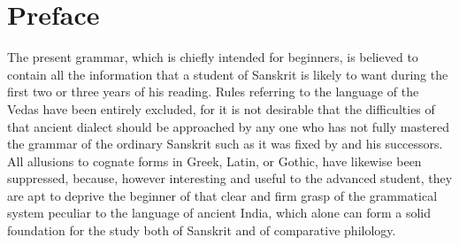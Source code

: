 \def\DevnagVersion{2.17}%
\chapter{Preface}

The present grammar, which is chiefly intended for beginners, is
believed to contain all the information that a student of Sanskrit is
likely to want during the first two or three years of his reading. Rules
referring to the language of the Vedas have been entirely excluded, for
it is not desirable that the difficulties of that ancient dialect should
be approached by any one who has not fully mastered the grammar of the
ordinary Sanskrit such as it was fixed by \panini{} and his successors.
All allusions to cognate forms in Greek, Latin, or Gothic, have likewise
been suppressed, because, however interesting and useful to the advanced
student, they are apt to deprive the beginner of that clear and firm
grasp of the grammatical system peculiar to the language of ancient
India, which alone can form a solid foundation for the study both of
Sanskrit and of comparative philology.

